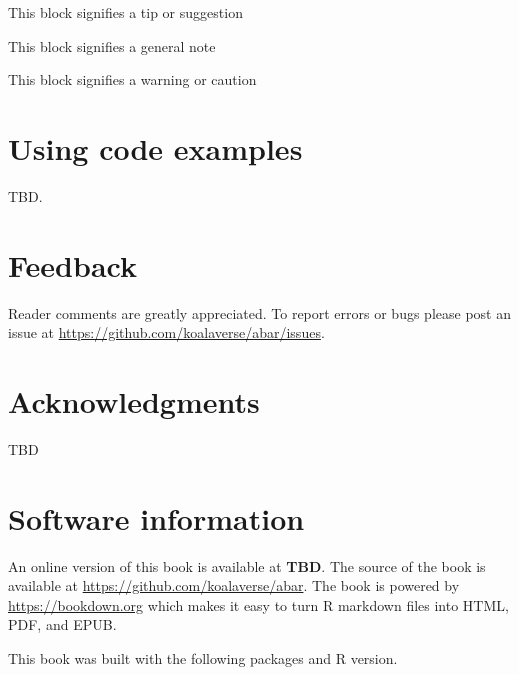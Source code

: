 \documentclass[]{book}
\theoremstyle{definition}
\theoremstyle{definition}
\theoremstyle{definition}
\theoremstyle{remark}
\begin{document}
\begin{tip}
This block signifies a tip or suggestion
\end{tip}

\begin{note}
This block signifies a general note
\end{note}

\begin{warning}
This block signifies a warning or caution
\end{warning}

\hypertarget{using-code-examples}{%
\section*{Using code examples}\label{using-code-examples}}

TBD.

\hypertarget{feedback}{%
\section*{Feedback}\label{feedback}}

Reader comments are greatly appreciated. To report errors or bugs please
post an issue at \url{https://github.com/koalaverse/abar/issues}.

\hypertarget{acknowledgments}{%
\section*{Acknowledgments}\label{acknowledgments}}

TBD

\hypertarget{software-information}{%
\section*{Software information}\label{software-information}}

An online version of this book is available at \textbf{TBD}. The source
of the book is available at \url{https://github.com/koalaverse/abar}.
The book is powered by \url{https://bookdown.org} which makes it easy to
turn R markdown files into HTML, PDF, and EPUB.

This book was built with the following packages and R version.
\end{document}
